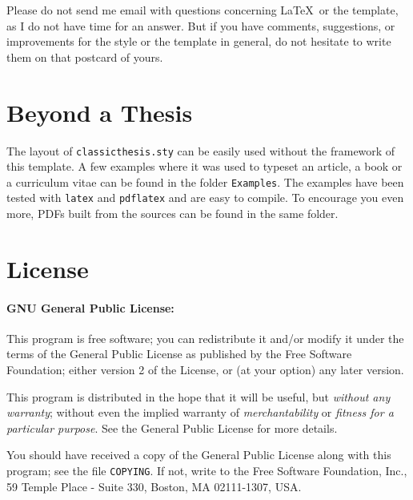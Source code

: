 Please do not send me email with questions concerning \LaTeX\ or the
template, as I do not have time for an answer. But if you have
comments, suggestions, or improvements for the style or the template
in general, do not hesitate to write them on that postcard of yours.


\section{Beyond a Thesis}
The layout of \texttt{classicthesis.sty} can be easily used without the
framework of this template. A few examples where it was used to typeset 
an article, a book or a curriculum vitae can be found in the folder 
\texttt{Examples}. The examples have been tested with  
\texttt{latex} and \texttt{pdflatex} and are easy to compile. To 
encourage you even more, PDFs built from the sources can be found in the 
same folder. 

%


\section{License}
\paragraph{GNU General Public License:} This program is free software;
you can redistribute it and/or modify
 it under the terms of the  General Public License as
 published by
 the Free Software Foundation; either version 2 of the License, or
 (at your option) any later version.

 This program is distributed in the hope that it will be useful,
 but \emph{without any warranty}; without even the implied warranty of
 \emph{merchant\-ability} or \emph{fitness for a particular purpose}.
 See the
  General Public License for more details.

 You should have received a copy of the  General
 Public License
 along with this program; see the file \texttt{COPYING}.  If not,
 write to
 the Free Software Foundation, Inc., 59 Temple Place - Suite 330,
 Boston, MA 02111-1307, USA.





